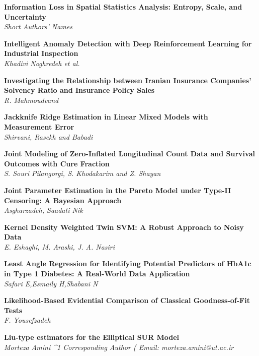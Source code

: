 \noindent
{\bf
Information Loss in Spatial Statistics Analysis: Entropy, Scale, and Uncertainty
}\dotfill \pageref{p.1331}\\
{\small \it
Short Authors' Names
}


\noindent
{\bf
Intelligent Anomaly Detection with Deep Reinforcement Learning for Industrial Inspection
}\dotfill \pageref{p.1072}\\
{\small \it
Khadivi Noghredeh et al.
}


\noindent
{\bf
Investigating the Relationship between Iranian Insurance Companies' Solvency Ratio and Insurance Policy Sales
}\dotfill \pageref{p.1004}\\
{\small \it
R. Mahmoudvand
}


\noindent
{\bf
Jackknife Ridge Estimation in Linear Mixed Models with Measurement Error
}\dotfill \pageref{p.1217}\\
{\small \it
Shirvani, Rasekh and Babadi
}


\noindent
{\bf
Joint Modeling of Zero-Inflated Longitudinal Count Data and Survival Outcomes with Cure Fraction
}\dotfill \pageref{p.1266}\\
{\small \it
S. Souri Pilangorgi, S. Khodakarim and Z. Shayan
}


\noindent
{\bf
Joint Parameter Estimation in the Pareto Model under Type-II Censoring: A Bayesian Approach
}\dotfill \pageref{p.1338}\\
{\small \it
Asgharzadeh, Saadati Nik
}


\noindent
{\bf
Kernel Density Weighted Twin SVM: A Robust Approach to Noisy Data
}\dotfill \pageref{p.1081}\\
{\small \it
E. Eshaghi, M. Arashi, J. A. Nasiri
}


\noindent
{\bf
Least Angle Regression for Identifying Potential Predictors of HbA1c in Type 1 Diabetes: A Real-World Data Application
}\dotfill \pageref{p.1147}\\
{\small \it
Safari E,Esmaily H,Shabani N
}


\noindent
{\bf
Likelihood-Based Evidential Comparison of Classical Goodness-of-Fit Tests
}\dotfill \pageref{p.1052}\\
{\small \it
F. Yousefzadeh
}


\noindent
{\bf
Liu-type estimators for the Elliptical SUR Model
}\dotfill \pageref{p.1086}\\
{\small \it
Morteza Amini ^1 Corresponding Author ( Email: morteza.amini@ut.ac.ir
}


